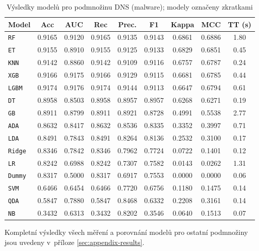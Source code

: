 \begin{table}[H]
    \centering
    \begin{tabular}{|l|c|c|c|c|c|c|c|c|}
    \hline
    \textbf{Model} & \textbf{Acc} & \textbf{AUC} & \textbf{Rec} & \textbf{Prec.} & \textbf{F1} & \textbf{Kappa} & \textbf{MCC} & \textbf{TT (s)} \\
    \hline
    \texttt{RF} & 0.9165 & 0.9120 & 0.9165 & 0.9135 & 0.9143 & 0.6861 & 0.6886 & 1.80 \\
    \texttt{ET} & 0.9155 & 0.8910 & 0.9155 & 0.9125 & 0.9133 & 0.6829 & 0.6851 & 0.45 \\
    \texttt{KNN} & 0.9142 & 0.8860 & 0.9142 & 0.9109 & 0.9116 & 0.6757 & 0.6787 & 0.24 \\
    \texttt{XGB} & 0.9166 & 0.9175 & 0.9166 & 0.9129 & 0.9115 & 0.6681 & 0.6785 & 0.44 \\
    \texttt{LGBM} & 0.9174 & 0.9176 & 0.9174 & 0.9144 & 0.9113 & 0.6647 & 0.6794 & 0.61 \\
    \texttt{DT} & 0.8958 & 0.8503 & 0.8958 & 0.8957 & 0.8957 & 0.6268 & 0.6271 & 0.19 \\
    \texttt{GB} & 0.8911 & 0.8799 & 0.8911 & 0.8921 & 0.8728 & 0.4991 & 0.5538 & 2.77 \\
    \texttt{ADA} & 0.8632 & 0.8417 & 0.8632 & 0.8536 & 0.8335 & 0.3352 & 0.3997 & 0.71 \\
    \texttt{LDA} & 0.8491 & 0.7843 & 0.8491 & 0.8264 & 0.8136 & 0.2532 & 0.3100 & 0.17 \\
    \texttt{Ridge} & 0.8346 & 0.7842 & 0.8346 & 0.7962 & 0.7724 & 0.0722 & 0.1401 & 0.12 \\
    \texttt{LR} & 0.8242 & 0.6988 & 0.8242 & 0.7307 & 0.7582 & 0.0143 & 0.0262 & 1.31 \\
    \texttt{Dummy} & 0.8317 & 0.5000 & 0.8317 & 0.6917 & 0.7553 & 0.0000 & 0.0000 & 0.06 \\
    \texttt{SVM} & 0.6466 & 0.6454 & 0.6466 & 0.7720 & 0.6756 & 0.1180 & 0.1475 & 0.14 \\
    \texttt{QDA} & 0.5847 & 0.7880 & 0.5847 & 0.8468 & 0.6332 & 0.2208 & 0.3161 & 0.14 \\
    \texttt{NB} & 0.3432 & 0.6313 & 0.3432 & 0.8202 & 0.3546 & 0.0640 & 0.1513 & 0.07 \\
    \hline
    \end{tabular}
    \caption{Výsledky modelů pro podmnožinu DNS (malware); modely označeny zkratkami}
    \label{tab:malware_dns_results}
\end{table}

Kompletní výsledky všech měření a porovnání modelů pro ostatní podmnožiny jsou uvedeny v~příloze \ref{sec:appendix-results}.


